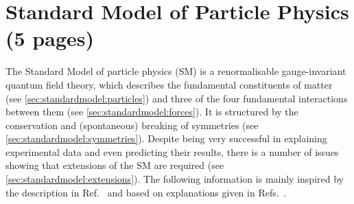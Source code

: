 
\chapter{Standard Model of Particle Physics (5 pages)}
\label{sec:standardmodel}

The Standard Model of particle physics (SM) is a renormalisable
gauge-invariant quantum field theory, which describes the fundamental
constituents of matter (see \cref{sec:standardmodel:particles}) and three of
the four fundamental interactions between them (see
\cref{sec:standardmodel:forces}). It is structured by the conservation
and (spontaneous) breaking of symmetries (see
\cref{sec:standardmodel:symmetries}). Despite being very successful in
explaining experimental data and even predicting their results, there is a
number of issues showing that extensions of the SM are required (see
\cref{sec:standardmodel:extensions}). The following information is mainly
inspired by the description in Ref.~\cite{Brock:2011zz} and based on
explanations given in Refs.~\cite{Griffiths:2008zz,Perkins:1982xb}.







